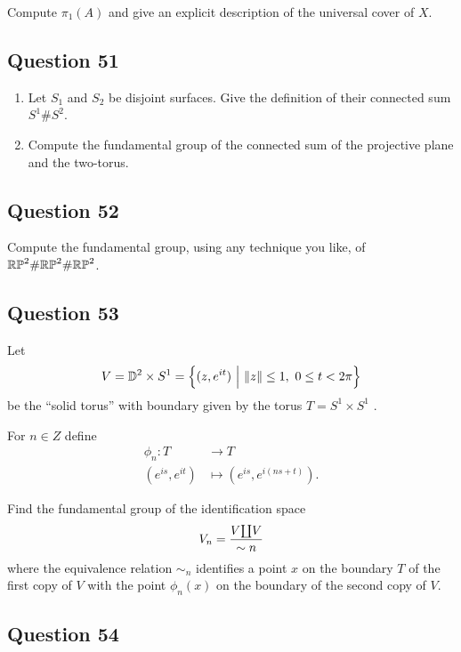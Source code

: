 \documentclass[12pt]{article}
\begin{document}
Compute \(\pi_1 (A)\) and give an explicit description of the universal
cover of \(X\).

\hypertarget{question-51-3}{%
\subsection{Question 51}\label{question-51-3}}

\begin{enumerate}
\def\labelenumi{\alph{enumi}.}
\item
  Let \(S_1\) and \(S_2\) be disjoint surfaces. Give the definition of
  their connected sum \(S^1 \#S^2\).
\item
  Compute the fundamental group of the connected sum of the projective
  plane and the two-torus.
\end{enumerate}

\hypertarget{question-52-3}{%
\subsection{Question 52}\label{question-52-3}}

Compute the fundamental group, using any technique you like, of
\({\mathbb{RP}}^2 \#{\mathbb{RP}}^2 \#{\mathbb{RP}}^2\).

\hypertarget{question-53-3}{%
\subsection{Question 53}\label{question-53-3}}

Let \[
V = {\mathbb{D}}^2 \times S^1 = \left\{{ (z, e^{it}) {~\mathrel{\Big|}~} {\left\lVert {z} \right\rVert} \leq 1,~~ 0 \leq t < 2\pi}\right\}
\] be the ``solid torus'' with boundary given by the torus
\(T = S^1 \times S^1\) .

For \(n \in Z\) define \begin{align*}
\phi_n : T &\to T \\
(e^{is} , e^{it} ) &\mapsto (e^{is} , e^{i(ns+t)})
.\end{align*}

Find the fundamental group of the identification space \[
V_n = {V{\coprod} V \over \sim n}
\] where the equivalence relation \(\sim_n\) identifies a point \(x\) on
the boundary \(T\) of the first copy of \(V\) with the point
\(\phi_n (x)\) on the boundary of the second copy of \(V\).

\hypertarget{question-54-3}{%
\subsection{Question 54}\label{question-54-3}}
\end{document}
